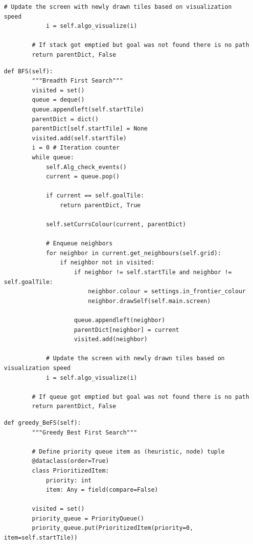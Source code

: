 \documentclass[12pt]{report}			%
\begin{document}
\begin{appendices}
\begin{lstlisting}[caption={Algoritmus DFS},captionpos=b]
            # Update the screen with newly drawn tiles based on visualization speed
            i = self.algo_visualize(i)

        # If stack got emptied but goal was not found there is no path 
        return parentDict, False
	\end{lstlisting}
	\newpage
					\begin{lstlisting}[caption={Algoritmus BFS},captionpos=b]
    def BFS(self):
        """Breadth First Search"""
        visited = set()
        queue = deque()
        queue.appendleft(self.startTile)
        parentDict = dict()
        parentDict[self.startTile] = None
        visited.add(self.startTile)
        i = 0 # Iteration counter
        while queue:
            self.Alg_check_events()
            current = queue.pop()
            
            if current == self.goalTile:
                return parentDict, True

            self.setCurrsColour(current, parentDict)

            # Enqueue neighbors
            for neighbor in current.get_neighbours(self.grid):
                if neighbor not in visited:
                    if neighbor != self.startTile and neighbor != self.goalTile:
                        neighbor.colour = settings.in_frontier_colour
                        neighbor.drawSelf(self.main.screen)
                        
                    queue.appendleft(neighbor)
                    parentDict[neighbor] = current
                    visited.add(neighbor)
                    
            # Update the screen with newly drawn tiles based on visualization speed
            i = self.algo_visualize(i)

        # If queue got emptied but goal was not found there is no path 
        return parentDict, False
		\end{lstlisting}
		\newpage
		\begin{lstlisting}[caption={Algoritmus greedy best-first search},captionpos=b]
		def greedy_BeFS(self):
        """Greedy Best First Search"""

        # Define priority queue item as (heuristic, node) tuple
        @dataclass(order=True)
        class PrioritizedItem: 
            priority: int
            item: Any = field(compare=False)

        visited = set()
        priority_queue = PriorityQueue() 
        priority_queue.put(PrioritizedItem(priority=0, item=self.startTile)) 


\end{lstlisting}
\end{appendices}
\end{document}
